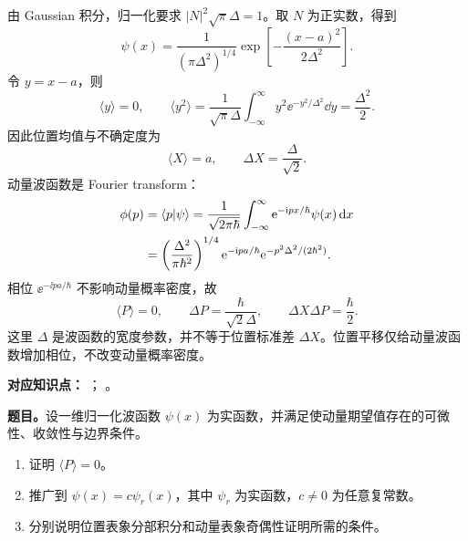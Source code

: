 \begin{checkedsolution}
由 Gaussian 积分，归一化要求 $|N|^2\sqrt\pi\Delta=1$。取 $N$ 为正实数，得到
\begin{equation}
  \psi(x)
  =\frac1{(\pi\Delta^2)^{1/4}}
   \exp\left[-\frac{(x-a)^2}{2\Delta^2}\right].
  \label{eq:QM-C04-S02-gaussian-position}
\end{equation}
令 $y=x-a$，则
\[
  \langle y\rangle=0,\qquad
  \langle y^2\rangle
  =\frac1{\sqrt\pi\Delta}\int_{-\infty}^{\infty}
    y^2\ee^{-y^2/\Delta^2}\dd y
  =\frac{\Delta^2}{2}.
\]
因此位置均值与不确定度为
\begin{equation}
  \boxed{\langle X\rangle=a},
  \qquad
  \boxed{\Delta X=\frac{\Delta}{\sqrt2}}.
  \label{eq:QM-C04-S02-gaussian-position-moments}
\end{equation}
动量波函数是 Fourier transform：
\begin{align}
  \phi(p)
  &=\left\langle p \middle| \psi \right\rangle
   =\frac1{\sqrt{2\pi\hbar}}
    \int_{-\infty}^{\infty}
    \mathrm{e}^{-\mathrm{i} px/\hbar}\psi(x)\mathop{}\!\mathrm{d} x
  \notag\\
  &=\left(\frac{\Delta^2}{\pi\hbar^2}\right)^{1/4}
    \mathrm{e}^{-\mathrm{i} pa/\hbar}
    \mathrm{e}^{-p^2\Delta^2/(2\hbar^2)}.
  \label{eq:QM-C04-S02-gaussian-momentum}
\end{align}
相位 $\ee^{-\ii pa/\hbar}$ 不影响动量概率密度，故
\begin{equation}
  \boxed{\langle P\rangle=0},
  \qquad
  \boxed{\Delta P=\frac{\hbar}{\sqrt2\Delta}},
  \qquad
  \boxed{\Delta X\Delta P=\frac{\hbar}{2}}.
  \label{eq:QM-C04-S02-gaussian-uncertainty}
\end{equation}
这里 $\Delta$ 是波函数的宽度参数，并不等于位置标准差 $\Delta X$。位置平移仅给动量波函数增加相位，不改变动量概率密度。
\end{checkedsolution}


\textbf{对应知识点：}
；
。

\textbf{题目。}设一维归一化波函数 $\psi(x)$ 为实函数，并满足使动量期望值存在的可微性、收敛性与边界条件。
\begin{enumerate}[label=(\arabic*)]
  \item 证明 $\langle P\rangle=0$。
  \item 推广到 $\psi(x)=c\psi_r(x)$，其中 $\psi_r$ 为实函数，$c\neq0$ 为任意复常数。
  \item 分别说明位置表象分部积分和动量表象奇偶性证明所需的条件。
\end{enumerate}

